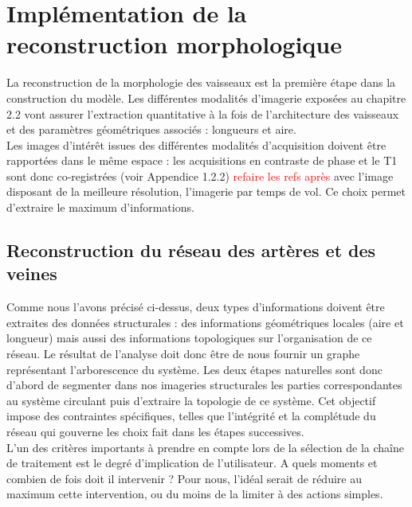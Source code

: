 
\chapter{Implémentation de la reconstruction morphologique}
\label{chap:morpho}	
	\minitoc
	

La reconstruction de la morphologie des vaisseaux est la première étape dans la construction du modèle. Les différentes modalités d’imagerie exposées au chapitre 2.2 vont assurer l’extraction quantitative à la fois de l’architecture des vaisseaux et des paramètres géométriques associés : longueurs et aire. \\
Les images d’intérêt issues des différentes modalités d’acquisition doivent être rapportées dans le même espace : les acquisitions en contraste de phase et le T1 sont donc co-registrées (voir Appendice 1.2.2) \textcolor{red}{refaire les refs après} avec l’image disposant de la meilleure résolution, l’imagerie par temps de vol. Ce choix permet d’extraire le maximum d’informations. 
\section{Reconstruction du réseau des artères et des veines}
Comme nous l’avons précisé ci-dessus, deux types d’informations doivent être extraites des données structurales : des informations géométriques locales (aire et longueur) mais aussi des informations topologiques sur l’organisation de ce réseau. Le résultat de l’analyse doit donc être de nous fournir un graphe représentant l’arborescence du système. Les deux étapes naturelles sont donc d’abord de segmenter dans nos imageries structurales les parties correspondantes au système circulant puis d’extraire la topologie de ce système. Cet objectif impose des contraintes spécifiques, telles que l’intégrité et la complétude du réseau qui gouverne les choix fait dans les étapes successives.\\
L’un des critères importants à prendre en compte lors de la sélection de la chaîne de traitement est le degré d’implication de l’utilisateur. A quels moments et combien de fois doit il intervenir ? Pour nous, l’idéal serait de réduire au maximum cette intervention, ou du moins de la limiter à des actions simples. 
